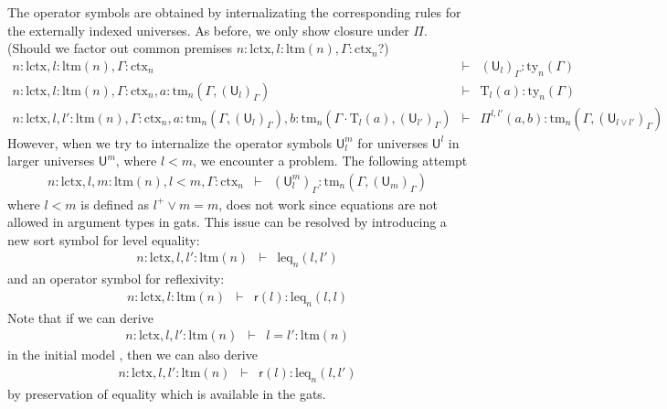 \documentclass[11pt,a4paper]{article}
\theoremstyle{definition}
\newcommand{\UU}{\mathsf{U}}
\newcommand{\refl}{\mathsf{r}}
\newcommand{\MB}[1]{{\color{red}{#1}}}
\def\UU{\mathsf{U}}
\newcommand{\N}{\mathsf{N}}
\def\Pihat{\Pi}
\def\lctx{\mathrm{lctx}}
\def\ltm{\mathrm{ltm}}
\def\leq{\mathrm{leq}}
\newcommand{\ctx}{\mathrm{ctx}}
\newcommand{\ty}{\mathrm{ty}}
\newcommand{\tm}{\mathrm{tm}}
\def\U{\mathsf{U}}
\newcommand{\Ta}{\mathrm{T}}
\begin{document}
The operator symbols are obtained by internalizating the corresponding rules for the externally indexed universes. As before, we only show closure under $\Pi$. (Should we factor out common premises $n : \lctx, l : \ltm(n), \Gamma : \ctx_n$?)
\begin{eqnarray*}
n : \lctx, l : \ltm(n), \Gamma : \ctx_n &\vdash& (\U_{l})_\Gamma : \ty_n(\Gamma)\\
n : \lctx, l : \ltm(n), \Gamma : \ctx_n, a : \tm_n(\Gamma,(\U_{l})_\Gamma) &\vdash& {\Ta_{l}}(a) : \ty_n(\Gamma)\\
n : \lctx, l, l' : \ltm(n), \Gamma : \ctx_n,
a : \tm_n(\Gamma,(\U_{l})_\Gamma),
b :  \tm_n(\Gamma \cdot \Ta_{l}(a), (\U_{l'})_\Gamma)
&\vdash&
 \Pihat^{l,l'}(a,b) : \tm_n(\Gamma,(\U_{l \vee l'})_\Gamma)
\end{eqnarray*}
However, when we try to internalize the operator symbols $\UU^m_l$ for universes $\UU^l$ in larger universes $\UU^m$, where $l < m$, we encounter a problem. The following attempt
\begin{eqnarray*}
n : \lctx, l, m : \ltm(n), l < m, \Gamma : \ctx_n&\vdash&(\UU^m_l)_\Gamma: \tm_n(\Gamma,(\UU_{m})_\Gamma)
\end{eqnarray*}
where $l < m$ is defined as $l^+ \vee m = m$, does not work since equations are not allowed in argument types in gats. This issue can be resolved by introducing a new sort symbol for level equality:
\begin{eqnarray*}
n : \lctx, l, l'  : \ltm(n) &\vdash& \leq_n(l,l')
\end{eqnarray*}
and an operator symbol for reflexivity:
\begin{eqnarray*}
n : \lctx, l : \ltm(n) &\vdash& \refl(l) :  \leq_n(l,l)
\end{eqnarray*}
Note that if we can derive 
\begin{eqnarray*}
n : \lctx, l, l'  : \ltm(n) &\vdash& l = l' : \ltm(n)
\end{eqnarray*}
in the initial model \MB{or: in the lattice}, then we can also derive
\begin{eqnarray*}
n : \lctx, l,l' : \ltm(n) &\vdash& \refl(l) :  \leq_n(l,l')
\end{eqnarray*}
by preservation of equality which is available in the gats.
\end{document}
